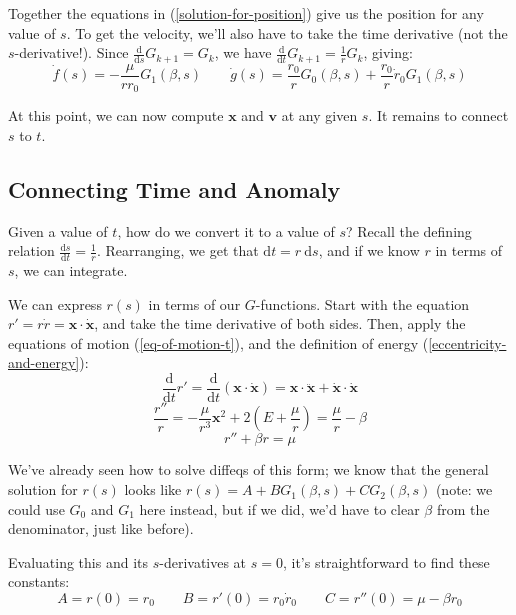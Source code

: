 \documentclass{article}
\newcommand{\dd}{\mathrm{d}}
\newcommand{\der}[2]{\frac{\dd #1}{\dd #2}}
\numberwithin{equation}{subsection}
\begin{document}
Together the equations in (\ref{solution-for-position}) give us the position for any value of $s$. To get the velocity, we'll also have to take the time derivative (not the $s$-derivative!). Since $\der{}{s} G_{k+1} = G_k$, we have $\der{}{t} G_{k+1} = \frac{1}{r} G_k$, giving:
\begin{equation}
\label{solution-for-velocity}
\dot f(s) = - \frac{\mu}{r r_0} G_1(\beta, s)
\qquad
\dot g(s) = \frac{r_0}{r} G_0(\beta, s) + \frac{r_0}{r} \dot{r}_0 G_1(\beta, s)
\end{equation}

At this point, we can now compute $\bm x$ and $\bm v$ at any given $s$. It remains to connect
$s$ to $t$.

\subsection{Connecting Time and Anomaly}

Given a value of $t$, how do we convert it to a value of $s$? Recall the defining relation $\der{s}{t} = \frac{1}{r}$. Rearranging, we get that $\dd t = r ~ \dd s$, and if we know $r$ in terms of $s$, we can integrate.

We can express $r(s)$ in terms of our $G$-functions. Start with the equation $r' = r \dot{r} = \bm x \cdot \dot{\bm x}$, and take the time derivative of both sides. Then, apply the equations of motion (\ref{eq-of-motion-t}), and the definition of energy (\ref{eccentricity-and-energy}):
\begin{equation*}
\der{}{t} r' = \der{}{t} (\bm x \cdot \bm{\dot x}) = \bm x \cdot \bm{\ddot x} + \bm{\dot x} \cdot \bm{\dot x}
\end{equation*}
\begin{equation*}
\frac{r''}{r} = -\frac{\mu}{r^3} \bm x^2 + 2 \left(E + \frac{\mu}{r} \right) = \frac{\mu}{r} -\beta
\end{equation*}
\begin{equation}
r'' + \beta r = \mu
\end{equation}

We've already seen how to solve diffeqs of this form; we know that the general solution for $r(s)$ looks like $r(s) = A + B G_1(\beta, s) + C G_2(\beta, s)$ (note: we could use $G_0$ and $G_1$ here instead, but if we did, we'd have to clear $\beta$ from the denominator, just like before).

Evaluating this and its $s$-derivatives at $s = 0$, it's straightforward to find these constants:
\begin{equation}
A = r(0) = r_0 \qquad B = r'(0) = r_0 \dot{r}_0 \qquad C = r''(0) = \mu - \beta r_0
\end{equation}
\end{document}
